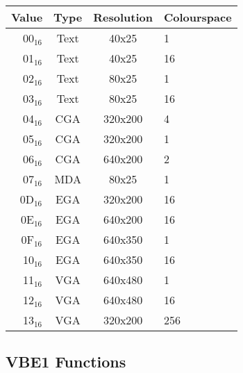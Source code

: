 \documentclass{article}
\begin{document}
\begin{tabular}{|r|c|c|l|}
	\hline
	\textbf{Value} & \textbf{Type} & \textbf{Resolution} & \textbf{Colourspace} \\
	\hline
	00$_{16}$ & Text & 40x25 & 1 \\
	\hline
	01$_{16}$ & Text & 40x25 & 16 \\
	\hline
	02$_{16}$ & Text & 80x25 & 1 \\
	\hline
	03$_{16}$ & Text & 80x25 & 16 \\
	\hline
	04$_{16}$ & CGA & 320x200 & 4 \\
	\hline
	05$_{16}$ & CGA & 320x200 & 1 \\
	\hline
	06$_{16}$ & CGA & 640x200 & 2 \\
	\hline
	07$_{16}$ & MDA & 80x25 & 1 \\
	\hline
	0D$_{16}$ & EGA & 320x200 & 16 \\
	\hline
	0E$_{16}$ & EGA & 640x200 & 16 \\
	\hline
	0F$_{16}$ & EGA & 640x350 & 1 \\
	\hline
	10$_{16}$ & EGA & 640x350 & 16 \\
	\hline
	11$_{16}$ & VGA & 640x480 & 1 \\
	\hline
	12$_{16}$ & VGA & 640x480 & 16 \\
	\hline
	13$_{16}$ & VGA & 320x200 & 256 \\
	\hline
\end{tabular}

\subsection{VBE1 Functions}
\label{vbe}
\end{document}
